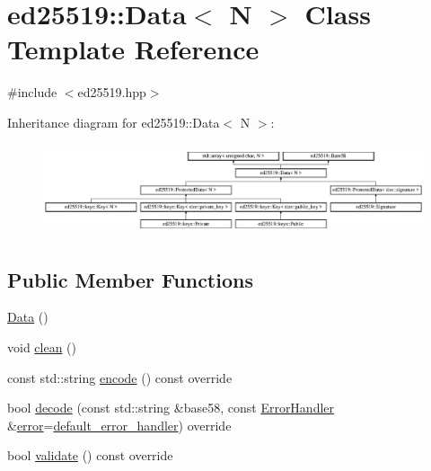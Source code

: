 \hypertarget{classed25519_1_1_data}{}\section{ed25519\+:\+:Data$<$ N $>$ Class Template Reference}
\label{classed25519_1_1_data}


{\ttfamily \#include $<$ed25519.\+hpp$>$}

Inheritance diagram for ed25519\+:\+:Data$<$ N $>$\+:\begin{figure}[H]
\begin{center}
\leavevmode
\includegraphics[height=2.702703cm]{classed25519_1_1_data}
\end{center}
\end{figure}
\subsection*{Public Member Functions}
\begin{DoxyCompactItemize}
\item 
\mbox{\hyperlink{classed25519_1_1_data_a2c637587095d6527cd4136926fb8b452}{Data}} ()
\item 
void \mbox{\hyperlink{classed25519_1_1_data_a65d5eba2b3c68f68001ef4d32645f9d9}{clean}} ()
\item 
const std\+::string \mbox{\hyperlink{classed25519_1_1_data_a2dc2e23b950a10b168d7509a63ffca53}{encode}} () const override
\item 
bool \mbox{\hyperlink{classed25519_1_1_data_a281d932d3c3fe7fd40ce86ea7eff559b}{decode}} (const std\+::string \&base58, const \mbox{\hyperlink{namespaceed25519_a6ba572942b3c18591fc869d52a6b16e6}{Error\+Handler}} \&\mbox{\hyperlink{namespaceed25519_ac93d0b5156eaca22197055e902920bc4}{error}}=\mbox{\hyperlink{namespaceed25519_a7c7bb6ed17541162959c33ed3e3b15fb}{default\+\_\+error\+\_\+handler}}) override
\item 
bool \mbox{\hyperlink{classed25519_1_1_data_ac365c9862b45379c677449b622c74da5}{validate}} () const override
\end{DoxyCompactItemize}
